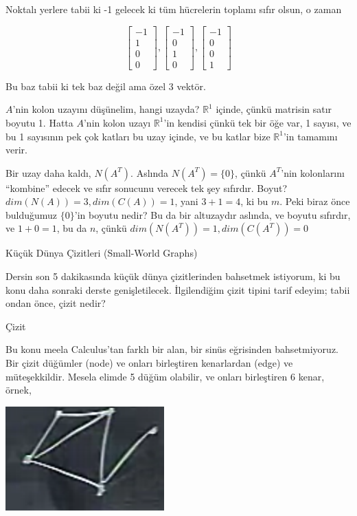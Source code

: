\documentclass[12pt,fleqn]{article}\usepackage{../../common}
\begin{document}
Noktalı yerlere tabii ki -1 gelecek ki tüm hücrelerin toplamı sıfır olsun,
o zaman 

$$ 
\left[\begin{array}{r}
-1 \\ 1 \\ 0 \\ 0
\end{array}\right], 
\left[\begin{array}{r}
-1  \\ 0 \\ 1 \\ 0
\end{array}\right], 
\left[\begin{array}{r}
-1  \\ 0 \\ 0 \\ 1
\end{array}\right]
 $$

Bu baz tabii ki tek baz değil ama özel 3 vektör. 

$A$'nin kolon uzayını düşünelim, hangi uzayda? $\mathbb{R}^1$ içinde, çünkü
matrisin satır boyutu 1. Hatta $A$'nin kolon uzayı $\mathbb{R}^1$'in
kendisi çünkü tek bir öğe var, 1 sayısı, ve bu 1 sayısının pek çok katları
bu uzay içinde, ve bu katlar bize $\mathbb{R}^1$'in tamamını verir.

Bir uzay daha kaldı, $N(A^T)$. Aslında $N(A^T)=\{0\}$, çünkü $A^T$'nin
kolonlarını ``kombine'' edecek ve sıfır sonucunu verecek tek şey
sıfırdır. Boyut? $dim(N(A))=3,dim(C(A))=1$, yani $3+1=4$, ki bu $m$. Peki
biraz önce bulduğumuz $\{0\}$'in boyutu nedir? Bu da bir altuzaydır
aslında, ve boyutu sıfırdır, ve $1+0=1$, bu da $n$, çünkü
$dim(N(A^T))=1,dim(C(A^T))=0$

Küçük Dünya Çizitleri (Small-World Graphs)

Dersin son 5 dakikasında küçük dünya çizitlerinden bahsetmek istiyorum, ki
bu konu daha sonraki derste genişletilecek. İlgilendiğim çizit tipini tarif
edeyim; tabii ondan önce, çizit nedir? 

Çizit

Bu konu meela Calculus'tan farklı bir alan, bir sinüs eğrisinden
bahsetmiyoruz. Bir çizit düğümler (node) ve onları birleştiren kenarlardan
(edge) ve müteşekkildir. Mesela elimde 5 düğüm olabilir, ve onları
birleştiren 6 kenar, örnek,

\includegraphics[height=4cm]{11_1.png}
\end{document}
